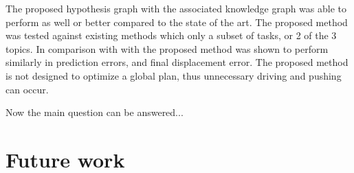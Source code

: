 The proposed hypothesis graph with the associated knowledge graph was able to perform as well or better compared to the state of the art. The proposed method was tested against existing methods which only a subset of tasks, or 2 of the 3 topics. In comparison with with\cite{sabbaghnovin_model_2021} the proposed method was shown to perform similarly in prediction errors, and final displacement error. The proposed method is not designed to optimize a global plan, thus unnecessary driving and pushing can occur. 
\vspace{\baselineskip}

Now the main question can be answered...

\section{Future work}%
\label{sec:future_work}

